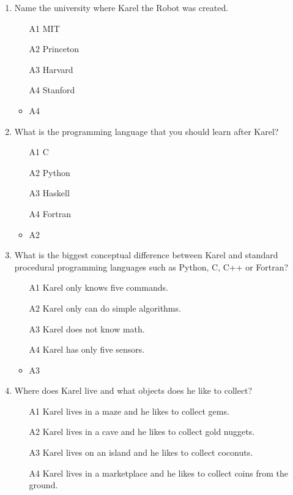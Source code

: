 \documentclass[article,A4,12pt]{llncs}
\begin{document}
\begin{enumerate}
\item Name the university where Karel the Robot was created.
\begin{enumerate}
\item[A1] MIT
\item[A2] Princeton
\item[A3] Harvard
\item[A4] Stanford
\end{enumerate}
  \begin{itemize}
    \item A4
  \end{itemize}
\item What is the programming language that you should learn after Karel?
\begin{enumerate}
\item[A1] C
\item[A2] Python
\item[A3] Haskell
\item[A4] Fortran
\end{enumerate}
  \begin{itemize}
    \item A2
  \end{itemize}
\item What is the biggest conceptual difference between Karel and standard
      procedural programming languages such as Python, C, C++ or Fortran?
\begin{enumerate}
\item[A1] Karel only knows five commands.
\item[A2] Karel only can do simple algorithms.
\item[A3] Karel does not know math.
\item[A4] Karel has only five sensors.
\end{enumerate}
  \begin{itemize}
    \item A3
  \end{itemize}
\item Where does Karel live and what objects does he like to collect?
\begin{enumerate}
\item[A1] Karel lives in a maze and he likes to collect gems.
\item[A2] Karel lives in a cave and he likes to collect gold nuggets.
\item[A3] Karel lives on an island and he likes to collect coconuts.
\item[A4] Karel lives in a marketplace and he likes to collect coins from the ground.

\end{enumerate}
\end{enumerate}
\end{document}
